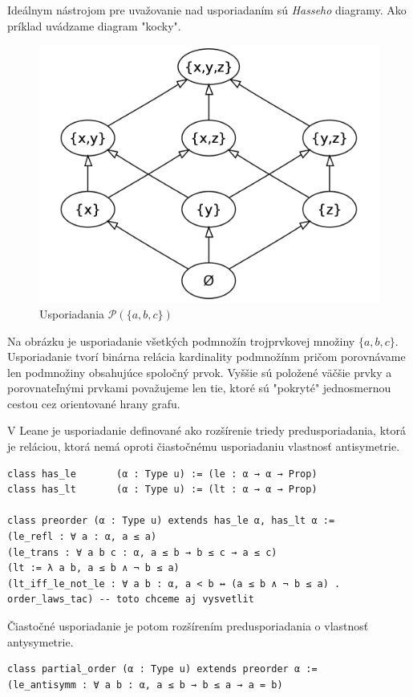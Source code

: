 \documentclass[a4paper,10pt,oneside]{report}%
\begin{document}
    Ideálnym nástrojom pre uvažovanie nad usporiadaním sú \emph{Hasseho} diagramy.
    Ako príklad uvádzame diagram "kocky".

\begin{figure}[!ht]
    \centering
    \includegraphics[scale=0.15]{cube.png}
    \caption{Usporiadania $\mathcal{P}(\{a,b,c\})$}
\end{figure}

    Na obrázku je usporiadanie všetkých podmnožín trojprvkovej množiny $\{ a,b,c \}$.
    Usporiadanie tvorí binárna relácia kardinality podmnožínm pričom porovnávame
len podmnožiny obsahujúce spoločný prvok.
    Vyššie sú položené väčšie prvky a porovnateľnými prvkami považujeme len tie,
ktoré sú "pokryté" jednosmernou cestou cez orientované hrany grafu.

    V Leane je usporiadanie definované ako rozšírenie triedy predusporiadania, ktorá
je reláciou, ktorá nemá oproti čiastočnému usporiadaniu vlastnosť antisymetrie.

\begin{lstlisting}
class has_le       (α : Type u) := (le : α → α → Prop)
class has_lt       (α : Type u) := (lt : α → α → Prop)

class preorder (α : Type u) extends has_le α, has_lt α :=
(le_refl : ∀ a : α, a ≤ a)
(le_trans : ∀ a b c : α, a ≤ b → b ≤ c → a ≤ c)
(lt := λ a b, a ≤ b ∧ ¬ b ≤ a)
(lt_iff_le_not_le : ∀ a b : α, a < b ↔ (a ≤ b ∧ ¬ b ≤ a) . order_laws_tac) -- toto chceme aj vysvetlit
\end{lstlisting}
Čiastočné usporiadanie je potom rozšírením predusporiadania o vlastnosť antysymetrie.
\begin{lstlisting}
class partial_order (α : Type u) extends preorder α :=
(le_antisymm : ∀ a b : α, a ≤ b → b ≤ a → a = b)
\end{lstlisting}
\end{document}
